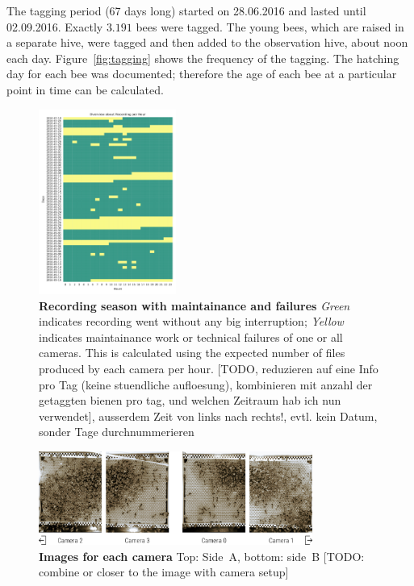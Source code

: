 The tagging period (67 days long) started on 28.06.2016 and lasted until 02.09.2016. Exactly $3.191$ bees were tagged. The young bees, which are raised in a separate hive, were tagged and then added to the observation hive, about noon each day. Figure~\ref{fig:tagging} shows the frequency of the tagging. The hatching day for each bee was documented; therefore the age of each bee at a particular point in time can be calculated.

\begin{figure}[htb]
	\centering
	\includegraphics[width=0.4\textwidth]{Figures/recording}
	\caption[Recording season with maintainance and failures]{\textbf{Recording season with maintainance and failures} \emph{Green} indicates recording went without any big interruption; \emph{Yellow} indicates maintainance work or technical failures of one or all cameras. This is calculated using the expected number of files produced by each camera per hour. [TODO, reduzieren auf eine Info pro Tag (keine stuendliche aufloesung), kombinieren mit anzahl der getaggten bienen pro tag, und welchen Zeitraum hab ich nun verwendet], ausserdem Zeit von links nach rechts!, evtl. kein Datum, sonder Tage durchnummerieren}
	\label{fig:period}
\end{figure}

\begin{figure}[htb]
	\centering
	\includegraphics[width=0.8\textwidth]{Figures/beesClose}
	\caption[Images for each camera]{\textbf{Images for each camera} Top: Side~A, bottom: side~B [TODO: combine or closer to the image with camera setup]}
	\label{fig:veryclose}
\end{figure}

